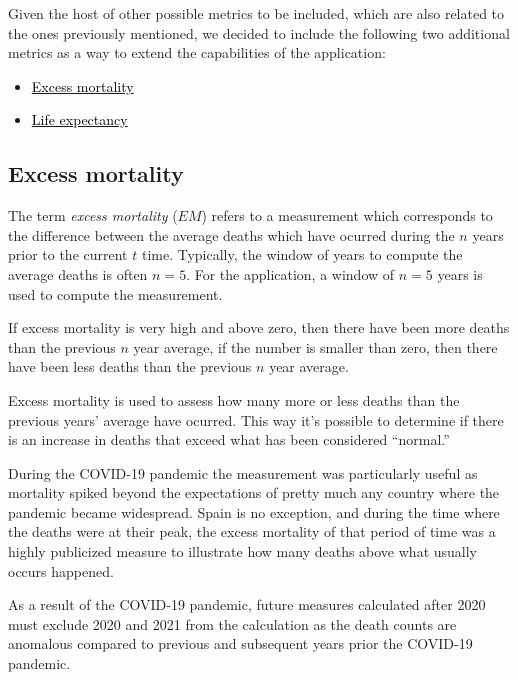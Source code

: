 \documentclass[
  a4paper]{article}
\begin{document}
Given the host of other possible metrics to be included, which are also
related to the ones previously mentioned, we decided to include the
following two additional metrics as a way to extend the capabilities of
the application:

\begin{itemize}
\item
  \protect\hyperlink{EM}{\textcolor{black}{Excess mortality}}
\item
  \protect\hyperlink{LE}{\textcolor{black}{Life expectancy}}
\end{itemize}

\newpage

\hypertarget{EM}{%
\subsection{Excess mortality}\label{EM}}

The term \emph{excess mortality} (\(EM\)) refers to a measurement which
corresponds to the difference between the average deaths which have
ocurred during the \(n\) years prior to the current \(t\) time.
Typically, the window of years to compute the average deaths is often
\(n = 5\). For the application, a window of \(n = 5\) years is used to
compute the measurement.

If excess mortality is very high and above zero, then there have been
more deaths than the previous \(n\) year average, if the number is
smaller than zero, then there have been less deaths than the previous
\(n\) year average.

Excess mortality is used to assess how many more or less deaths than the
previous years' average have ocurred. This way it's possible to
determine if there is an increase in deaths that exceed what has been
considered ``normal.''

During the COVID-19 pandemic the measurement was particularly useful as
mortality spiked beyond the expectations of pretty much any country
where the pandemic became widespread. Spain is no exception, and during
the time where the deaths were at their peak, the excess mortality of
that period of time was a highly publicized measure to illustrate how
many deaths above what usually occurs happened.

As a result of the COVID-19 pandemic, future measures calculated after
2020 must exclude 2020 and 2021 from the calculation as the death counts
are anomalous compared to previous and subsequent years prior the
COVID-19 pandemic.
\end{document}
